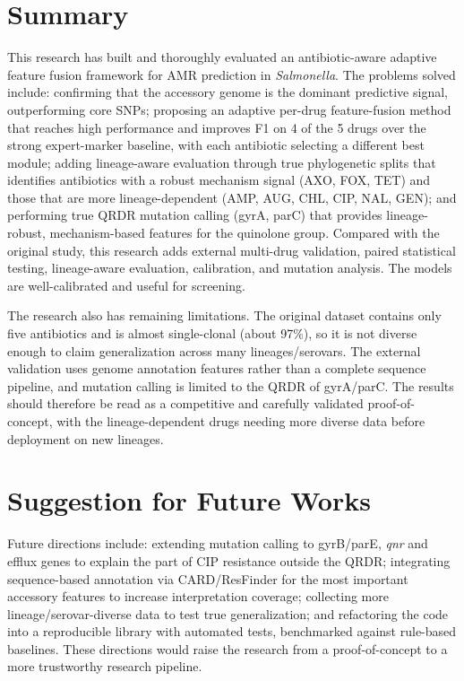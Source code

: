 \documentclass[../main.tex]{subfiles}
\begin{document}
\section{Summary}

This research has built and thoroughly evaluated an antibiotic-aware adaptive feature fusion framework for AMR prediction in \textit{Salmonella}. The problems solved include: confirming that the accessory genome is the dominant predictive signal, outperforming core SNPs; proposing an adaptive per-drug feature-fusion method that reaches high performance and improves F1 on 4 of the 5 drugs over the strong expert-marker baseline, with each antibiotic selecting a different best module; adding lineage-aware evaluation through true phylogenetic splits that identifies antibiotics with a robust mechanism signal (AXO, FOX, TET) and those that are more lineage-dependent (AMP, AUG, CHL, CIP, NAL, GEN); and performing true QRDR mutation calling (gyrA, parC) that provides lineage-robust, mechanism-based features for the quinolone group. Compared with the original study, this research adds external multi-drug validation, paired statistical testing, lineage-aware evaluation, calibration, and mutation analysis. The models are well-calibrated and useful for screening.

The research also has remaining limitations. The original dataset contains only five antibiotics and is almost single-clonal (about 97\%), so it is not diverse enough to claim generalization across many lineages/serovars. The external validation uses genome annotation features rather than a complete sequence pipeline, and mutation calling is limited to the QRDR of gyrA/parC. The results should therefore be read as a competitive and carefully validated proof-of-concept, with the lineage-dependent drugs needing more diverse data before deployment on new lineages.

\section{Suggestion for Future Works}

Future directions include: extending mutation calling to gyrB/parE, \textit{qnr} and efflux genes to explain the part of CIP resistance outside the QRDR; integrating sequence-based annotation via CARD/ResFinder for the most important accessory features to increase interpretation coverage; collecting more lineage/serovar-diverse data to test true generalization; and refactoring the code into a reproducible library with automated tests, benchmarked against rule-based baselines. These directions would raise the research from a proof-of-concept to a more trustworthy research pipeline.
\end{document}
